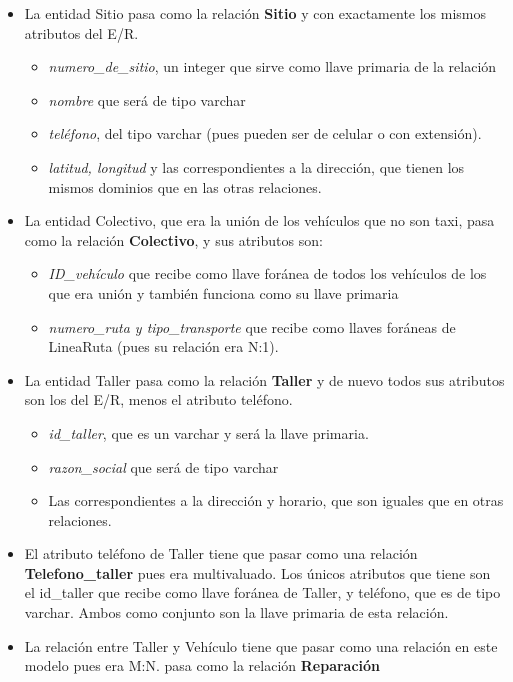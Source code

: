 \documentclass[11pt]{article}
\begin{document}
\begin{itemize}
\item La entidad Sitio pasa como la relación \textbf{Sitio} y con exactamente los mismos atributos del E/R.
    \begin{itemize}
    \item \textit{numero\_de\_sitio}, un integer que sirve como llave primaria de la relación
    \item \textit{nombre} que será de tipo varchar 
    \item \textit{teléfono}, del tipo varchar (pues pueden ser de celular o con extensión).
    \item \textit{latitud, longitud} y las correspondientes a la dirección, que tienen los mismos dominios que en las otras relaciones.
    \end{itemize}   
\item La entidad Colectivo, que era la unión de los vehículos que no son taxi, pasa como la relación \textbf{Colectivo}, y sus atributos son:
    \begin{itemize}
    \item \textit{ID\_vehículo} que recibe como llave foránea de todos los vehículos de los que era unión y también funciona como su llave primaria
    \item \textit{numero\_ruta y tipo\_transporte} que recibe como llaves foráneas de LineaRuta (pues su relación era N:1).
    \end{itemize}        
\item La entidad Taller pasa como la relación \textbf{Taller} y de nuevo todos sus atributos son los del E/R, menos el atributo teléfono.
    \begin{itemize}
    \item \textit{id\_taller}, que es un varchar y será la llave primaria.
    \item \textit{razon\_social} que será de tipo varchar
    \item Las correspondientes a la dirección y horario, que son iguales que en otras relaciones.
    \end{itemize}   
\item El atributo teléfono de Taller tiene que pasar como una relación \textbf{Telefono\_taller} pues era multivaluado. Los únicos atributos que tiene son el id\_taller que recibe como llave foránea de Taller, y teléfono, que es de tipo varchar. Ambos como conjunto son la llave primaria de esta relación.
\item La relación entre Taller y Vehículo tiene que pasar como una relación en este modelo pues era M:N. pasa como la relación \textbf{Reparación} %

\end{itemize}
\end{document}
